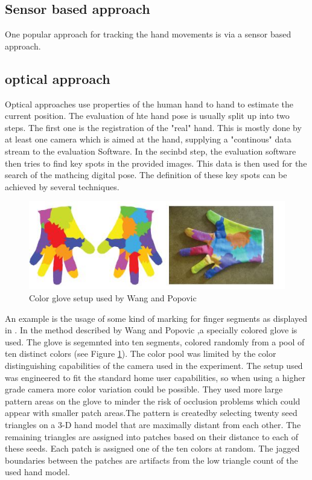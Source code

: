 \subsection{Sensor based approach}
\label{Sensor based approach}
One popular approach for tracking the hand movements is via a sensor based approach. 

\subsection{optical approach}
\label{Optical approach} 
Optical approaches use properties of the human hand to hand to estimate the current position. The evaluation of hte hand pose is usually split up into two steps. The first one is the registration of the "real" hand. This is mostly done by at least one camera which is aimed at the hand, supplying a "continous" data stream to the evaluation Software. In the secinbd step, the evaluation software then tries to find key spots in the provided images. This data is then used for the search of the mathcing digital pose. The definition of these key spots can be achieved by several techniques.\\
\begin{figure}
\includegraphics[scale=0.61]{images/wang_color_glove.JPG}
\caption{Color glove setup used by Wang and Popovic \cite{Wang.2009} }
\label{wang color glove}
\end{figure}
An example is the usage of some kind of marking for finger segments as displayed in \cite{Duca.2007,Fredriksson.2008,Wang.2009}.
In the method described by Wang and Popovic \cite{Wang.2009},a specially colored glove is used. The glove is segemnted into ten segments, colored randomly from a pool of ten distinct colors (see Figure \ref{wang color glove}). The color pool was limited by the color distinguishing capabilities of the camera used in the experiment. The setup used was engineered to fit the standard home user capabilities, so when using a higher grade camera more color variation could be possible. They used more large pattern areas on the glove to minder the risk of occlusion problems which could appear with smaller patch areas.The pattern is createdby selecting twenty seed triangles on a 3-D hand model that are maximally distant from each other. The remaining triangles are assigned into patches based on their distance to each of these seeds. Each patch is assigned one of the ten colors at random. The jagged boundaries between the patches are artifacts from the low triangle count of the used hand model.\\
